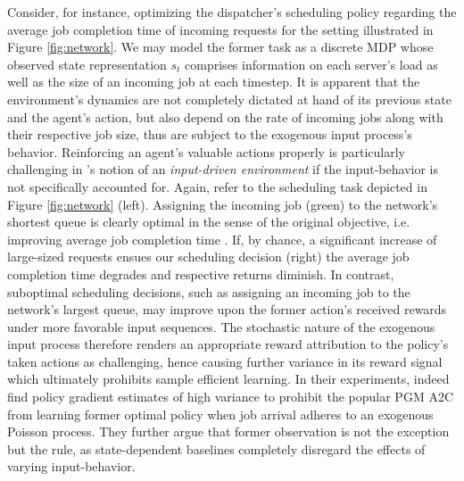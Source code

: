 Consider, for instance, optimizing the dispatcher's scheduling policy regarding the average job completion time of incoming requests for the setting illustrated in Figure \ref{fig:network}. We may model the former task as a discrete MDP whose observed state representation $s_t$ comprises information on each server's load as well as the size of an incoming job at each timestep. It is apparent that the environment's dynamics are not completely dictated at hand of its previous state and the agent's action, but also depend on the rate of incoming jobs along with their respective job size, thus are subject to the exogenous input process's behavior. Reinforcing an agent's valuable actions properly is particularly challenging in \citeauthor{mao2018variance}'s notion of an \textit{input-driven environment} if the input-behavior is not specifically accounted for. Again, refer to the scheduling task depicted in Figure \ref{fig:network} (left). Assigning the incoming job (green) to the network's shortest queue is clearly optimal in the sense of the original objective, i.e. improving average job completion time \cite{daley1987certain}. If, by chance, a significant increase of large-sized requests ensues our scheduling decision (right) the average job completion time degrades and respective returns diminish. In contrast, suboptimal scheduling decisions, such as assigning an incoming job to the network's largest queue, may improve upon the former action's received rewards under more favorable input sequences. The stochastic nature of the exogenous input process therefore renders an appropriate reward attribution to the policy's taken actions as challenging, hence causing further variance in its reward signal which ultimately prohibits sample efficient learning. In their experiments, \citeauthor{mao2018variance} indeed find policy gradient estimates of high variance to prohibit the popular PGM A2C from learning former optimal policy when job arrival adheres to an exogenous Poisson process. They further argue that former observation is not the exception but the rule, as state-dependent baselines completely disregard the effects of varying input-behavior. 









